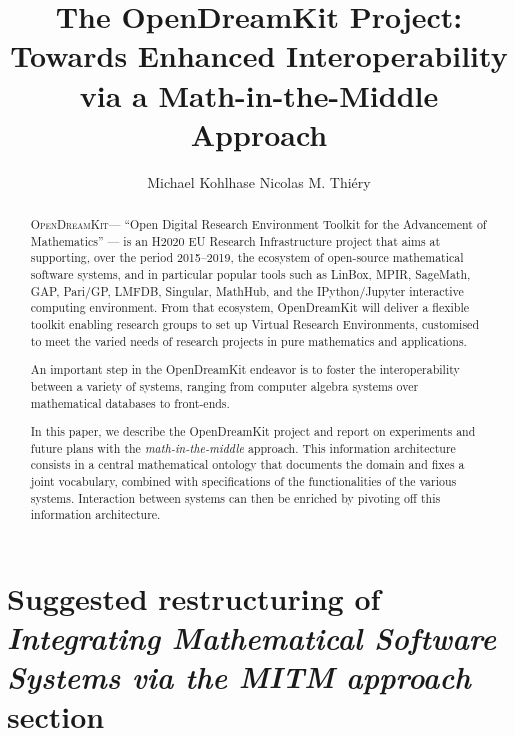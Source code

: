 \documentclass{llncs}
\title{The OpenDreamKit Project:\\
  Towards Enhanced Interoperability\\
  via a Math-in-the-Middle Approach}
\author{Michael Kohlhase\inst{1} Nicolas M. Thi\'ery\inst{2} }
\institute{Jacobs University, Bremen, Germany \and Universit\'e Paris-Sud, Paris, France}
\newcommand{\software}[1]{\textsc{#1}\xspace}
\newcommand{\ODK}{\software{OpenDreamKit}}
\begin{document}
\maketitle
\begin{abstract}
  \ODK --- ``Open Digital Research Environment Toolkit for the
  Advancement of Mathematics'' --- is an H2020 EU Research
  Infrastructure project that aims at supporting, over the period
  2015--2019, the ecosystem of open-source mathematical software
  systems, and in particular popular tools such as LinBox, MPIR,
  SageMath, GAP, Pari/GP, LMFDB, Singular, MathHub, and the
  IPython/Jupyter interactive computing environment. From that
  ecosystem, OpenDreamKit will deliver a flexible toolkit enabling
  research groups to set up Virtual Research Environments, customised
  to meet the varied needs of research projects in pure mathematics
  and applications.

  An important step in the OpenDreamKit endeavor is to foster the
  interoperability between a variety of systems, ranging from computer
  algebra systems over mathematical databases to front-ends.

  In this paper, we describe the OpenDreamKit project and report on experiments and future
  plans with the \emph{math-in-the-middle} approach.  This information architecture
  consists in a central mathematical ontology that documents the domain and fixes a joint
  vocabulary, combined with specifications of the functionalities of the various
  systems. Interaction between systems can then be enriched by pivoting off this
  information architecture.
\end{abstract}

\section*{Suggested restructuring of \emph{Integrating Mathematical Software Systems via the MITM approach} section}
\end{document}
